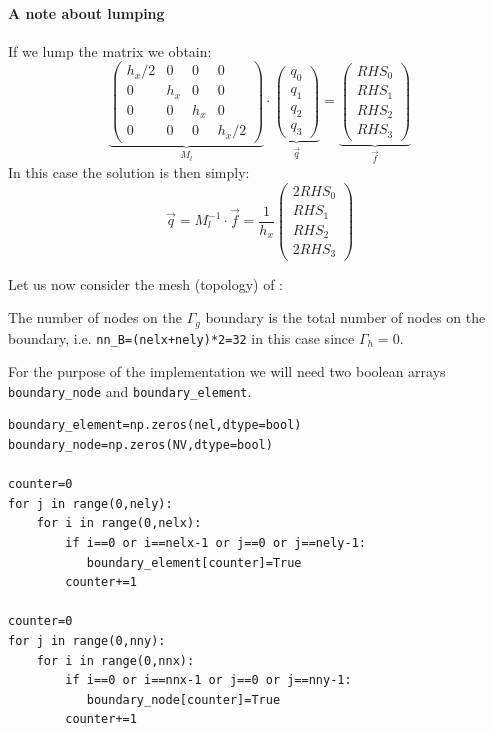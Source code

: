 \paragraph{A note about lumping} If we lump the matrix we obtain:
\begin{equation}
\underbrace{\left(
\begin{array}{cccc}
h_x/2 & 0  &  0 & 0\\
0 & h_x  & 0  & 0\\
0 & 0  & h_x  & 0 \\ 
0 & 0  &  0 & h_x/2
\end{array}
\right)}_{M_l}
\cdot
\underbrace{
\left(
\begin{array}{c}
q_0 \\ q_1 \\ q_2 \\ q_3
\end{array}
\right)
}_{\vec{q}}
=
\underbrace{
\left(
\begin{array}{c}
RHS_0 \\ RHS_1 \\ RHS_2 \\ RHS_3
\end{array}
\right)}_{\vec{f}}
\label{eq:mizu3}
\end{equation}
In this case the solution is then simply:
\[
\vec{q} = M_l^{-1} \cdot \vec{f}
=\frac{1}{h_x}
\left(
\begin{array}{c}
2RHS_0 \\ RHS_1 \\ RHS_2 \\ 2RHS_3
\end{array}
\right)
\]


\newpage
Let us now consider the mesh (topology) of \textcite{grls87}:
\begin{center}

\end{center}



The number of nodes on the $\Gamma_g$ boundary is the total
number of nodes on the boundary, i.e. \lstinline{nn_B=(nelx+nely)*2=32} in this case 
since $\Gamma_h=0$.

For the purpose of the implementation we will need two boolean arrays
\lstinline{boundary_node} and \lstinline{boundary_element}.

\begin{lstlisting}
boundary_element=np.zeros(nel,dtype=bool)  
boundary_node=np.zeros(NV,dtype=bool)  

counter=0
for j in range(0,nely):
    for i in range(0,nelx):
        if i==0 or i==nelx-1 or j==0 or j==nely-1: 
           boundary_element[counter]=True 
        counter+=1

counter=0
for j in range(0,nny):
    for i in range(0,nnx):
        if i==0 or i==nnx-1 or j==0 or j==nny-1: 
           boundary_node[counter]=True 
        counter+=1
\end{lstlisting}

